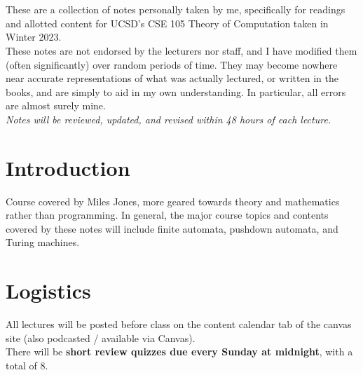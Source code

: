 \documentclass[a4paper, 12pt, margin=1.2in]{article}
\begin{document}
\maketitle
\newpage
\tableofcontents

\newpage
\section*{}
These are a collection of notes personally taken by me, specifically for readings and allotted content for UCSD's CSE 105 Theory of Computation taken in Winter 2023. \\
These notes are not endorsed by the lecturers nor staff, and I have modified them (often significantly) over random periods of time. They may become nowhere near accurate representations of what was actually lectured, or written in the books, and are simply to aid in my own understanding. In particular, all errors are almost surely mine.\\
\textit{Notes will be reviewed, updated, and revised within 48 hours of each lecture.}
\newpage

\section*{Introduction}
Course covered by Miles Jones, more geared towards theory and mathematics rather than programming. In general, the major course topics and contents covered by these notes will include finite automata, pushdown automata, and Turing machines.

\section*{Logistics}
All lectures will be posted before class on the content calendar tab of the canvas site (also podcasted / available via Canvas).\\ 
There will be \textbf{short review quizzes due every Sunday at midnight}, with a total of 8. 
\end{document}
